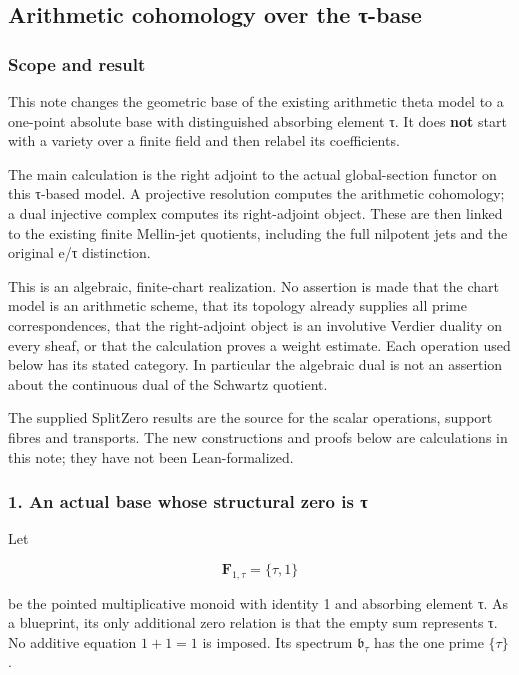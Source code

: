 \subsection{Arithmetic cohomology over the τ-base}\label{endpoint-tau_base--arithmetic-cohomology-over-the-ux3c4-base}

\subsubsection{Scope and result}\label{endpoint-tau_base--scope-and-result}

This note changes the geometric base of the existing arithmetic theta model to a one-point absolute base with distinguished absorbing element τ. It does \textbf{not} start with a variety over a finite field and then relabel its coefficients.

The main calculation is the right adjoint to the actual global-section functor on this τ-based model. A projective resolution computes the arithmetic cohomology; a dual injective complex computes its right-adjoint object. These are then linked to the existing finite Mellin-jet quotients, including the full nilpotent jets and the original e/τ distinction.

This is an algebraic, finite-chart realization. No assertion is made that the chart model is an arithmetic scheme, that its topology already supplies all prime correspondences, that the right-adjoint object is an involutive Verdier duality on every sheaf, or that the calculation proves a weight estimate. Each operation used below has its stated category. In particular the algebraic dual is not an assertion about the continuous dual of the Schwartz quotient.

The supplied SplitZero results are the source for the scalar operations, support fibres and transports. The new constructions and proofs below are calculations in this note; they have not been Lean-formalized.

\subsubsection{1. An actual base whose structural zero is τ}\label{endpoint-tau_base--an-actual-base-whose-structural-zero-is-ux3c4}

Let

\[
\mathbf F_{1,\tau}=\{\tau,1\}
\]

be the pointed multiplicative monoid with identity 1 and absorbing element τ. As a blueprint, its only additional zero relation is that the empty sum represents τ. No additive equation \(1+1=1\) is imposed. Its spectrum \(\mathfrak b_\tau\) has the one prime \(\{\tau\}\).

